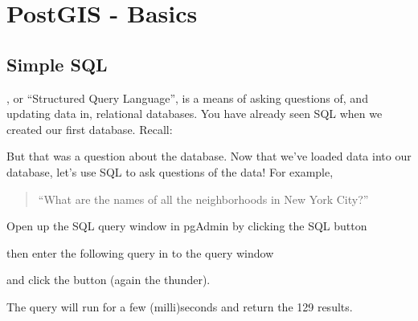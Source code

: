 \documentclass[a4paper,11pt,english]{sphinxmanual}
\begin{document}
\chapter{PostGIS - Basics}
\label{\detokenize{basic:postgis-basics}}\label{\detokenize{basic::doc}}

\section{Simple SQL}
\label{\detokenize{basic:simple-sql}}\label{\detokenize{basic:id1}}
{\hyperref[\detokenize{glossary:term-sql}]{}}, or “Structured Query Language”, is a means of asking questions of, and updating data in, relational databases. You have already seen SQL when we created our first database.  Recall:

\begin{sphinxVerbatim}[commandchars=\\\{\}]
 
\end{sphinxVerbatim}

But that was a question about the database.  Now that we’ve loaded data into our database, let’s use SQL to ask questions of the data! For example,
\begin{quote}

“What are the names of all the neighborhoods in New York City?”
\end{quote}

Open up the SQL query window in pgAdmin by clicking the SQL button

\noindent{}

then enter the following query in to the query window

\begin{sphinxVerbatim}[commandchars=\\\{\}]
   
\end{sphinxVerbatim}

and click the  button (again the thunder).

\noindent{}

The query will run for a few (milli)seconds and return the 129 results.

\noindent{}
\end{document}

